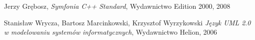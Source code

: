 \documentclass{article}
\begin{document}
	\begin{thebibliography}{9}
	
		Jerzy Grębosz,
		\textit{Symfonia C++ Standard},
		Wydawnictwo Edition 2000, 2008
	
		Stanisław Wrycza, Bartosz Marcinkowski, Krzysztof Wyrzykowski
		\textit{Język UML 2.0 w modelowaniu systemów informatycznych},
		Wydawnictwo Helion, 2006
	
	\end{thebibliography}
\end{document}
